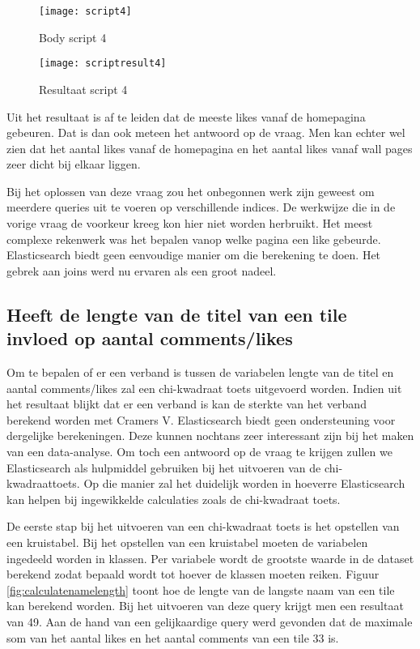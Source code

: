 \begin{figure}
	\centering
	\texttt{[image: script4]}
	\caption{Body script 4}
	\label{fig:script4}
\end{figure}

\begin{figure}
	\centering
	\texttt{[image: scriptresult4]}
	\caption{Resultaat script 4}
	\label{fig:scriptresult4}
\end{figure}

Uit het resultaat is af te leiden dat de meeste likes vanaf de homepagina gebeuren. Dat is dan ook meteen het antwoord op de vraag. Men kan echter wel zien dat het aantal likes vanaf de homepagina en het aantal likes vanaf wall pages zeer dicht bij elkaar liggen. 

Bij het oplossen van deze vraag zou het onbegonnen werk zijn geweest om meerdere queries uit te voeren op verschillende indices. De werkwijze die in de vorige vraag de voorkeur kreeg kon hier niet worden herbruikt. Het meest complexe rekenwerk was het bepalen vanop welke pagina een like gebeurde. Elasticsearch biedt geen eenvoudige manier om die berekening te doen. Het gebrek aan joins werd nu ervaren als een groot nadeel.

\subsection{Heeft de lengte van de titel van een tile invloed op aantal comments/likes}

Om te bepalen of er een verband is tussen de variabelen lengte van de titel en aantal comments/likes zal een chi-kwadraat toets uitgevoerd worden. Indien uit het resultaat blijkt dat er een verband is kan de sterkte van het verband berekend worden met Cramers V. Elasticsearch biedt geen ondersteuning voor dergelijke berekeningen. Deze kunnen nochtans zeer interessant zijn bij het maken van een data-analyse. Om toch een antwoord op de vraag te krijgen zullen we Elasticsearch als hulpmiddel gebruiken bij het uitvoeren van de chi-kwadraattoets. Op die manier zal het duidelijk worden in hoeverre Elasticsearch kan helpen bij ingewikkelde calculaties zoals de chi-kwadraat toets. 

De eerste stap bij het uitvoeren van een chi-kwadraat toets is het opstellen van een kruistabel. Bij het opstellen van een kruistabel moeten de variabelen ingedeeld worden in klassen. Per variabele wordt de grootste waarde in de dataset berekend zodat bepaald wordt tot hoever de klassen moeten reiken. Figuur \ref{fig:calculatenamelength} toont hoe de lengte van de langste naam van een tile kan berekend worden. Bij het uitvoeren van deze query krijgt men een resultaat van 49. Aan de hand van een gelijkaardige query werd gevonden dat de maximale som van het aantal likes en het aantal comments van een tile 33 is.

